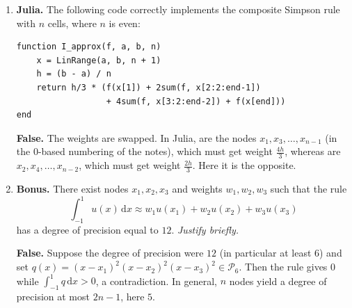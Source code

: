 \documentclass[a4paper]{article}
\renewcommand{\d}{\mathrm d}
\newcommand{\answer}[1]{%
    \ifdefined\showsolutions
        \par\smallskip
        {\small\color{blue!60!black}#1\par}
    \fi
}
\begin{document}
\begin{enumerate}
    \item
        \textbf{Julia.}
        The following code correctly implements the composite Simpson rule with $n$ cells, where $n$ is even:
        \begin{verbatim}
function I_approx(f, a, b, n)
    x = LinRange(a, b, n + 1)
    h = (b - a) / n
    return h/3 * (f(x[1]) + 2sum(f, x[2:2:end-1])
                  + 4sum(f, x[3:2:end-2]) + f(x[end]))
end
        \end{verbatim}
        \answer{\textbf{False.}
        The weights are swapped.
        In Julia, \julia{x[2:2:end-1]} are the nodes $x_1, x_3, \dotsc, x_{n-1}$ (in the 0-based numbering of the notes), which must get weight $\frac{4h}{3}$,
        whereas \julia{x[3:2:end-2]} are $x_2, x_4, \dotsc, x_{n-2}$, which must get weight $\frac{2h}{3}$.
        Here it is the opposite.}

    \item \textbf{Bonus.}
        There exist nodes $x_1, x_2, x_3$ and weights $w_1, w_2, w_3$ such that the rule
        \[
            \int_{-1}^{1} u(x) \, \d x \approx w_1 u(x_1) + w_2 u(x_2) + w_3 u(x_3)
        \]
        has a degree of precision equal to $12$.
        \emph{Justify briefly.}
        \answer{\textbf{False.}
        Suppose the degree of precision were $12$ (in particular at least $6$) and set $q(x) = (x - x_1)^2 (x - x_2)^2 (x - x_3)^2 \in \mathcal P_6$.
        Then the rule gives $0$ while $\int_{-1}^1 q \, \d x > 0$, a contradiction.
        In general, $n$ nodes yield a degree of precision at most $2n - 1$, here $5$.}
\end{enumerate}
\end{document}
